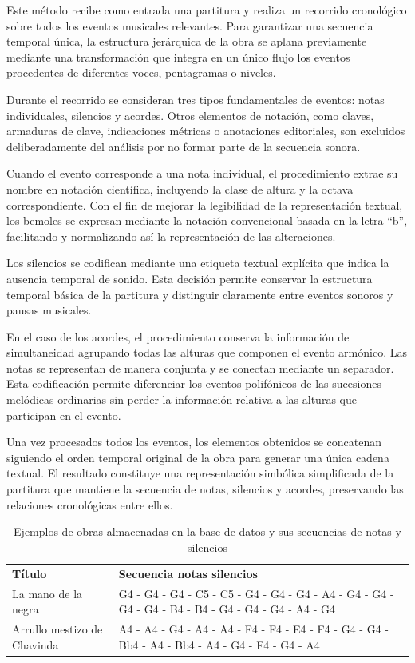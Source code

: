 Este método recibe como entrada una partitura y realiza un recorrido cronológico sobre todos los eventos musicales relevantes. Para garantizar una secuencia temporal única, la estructura jerárquica de la obra se aplana previamente mediante una transformación que integra en un único flujo los eventos procedentes de diferentes voces, pentagramas o niveles.

Durante el recorrido se consideran tres tipos fundamentales de eventos: notas individuales, silencios y acordes. Otros elementos de notación, como claves, armaduras de clave, indicaciones métricas o anotaciones editoriales, son excluidos deliberadamente del análisis por no formar parte de la secuencia sonora.

Cuando el evento corresponde a una nota individual, el procedimiento extrae su nombre en notación científica, incluyendo la clase de altura y la octava correspondiente. Con el fin de mejorar la legibilidad de la representación textual, los bemoles se expresan mediante la notación convencional basada en la letra “b”, facilitando y normalizando así la representación de las alteraciones.

Los silencios se codifican mediante una etiqueta textual explícita que indica la ausencia temporal de sonido. Esta decisión permite conservar la estructura temporal básica de la partitura y distinguir claramente entre eventos sonoros y pausas musicales.

En el caso de los acordes, el procedimiento conserva la información de simultaneidad agrupando todas las alturas que componen el evento armónico. Las notas se representan de manera conjunta y se conectan mediante un separador. Esta codificación permite diferenciar los eventos polifónicos de las sucesiones melódicas ordinarias sin perder la información relativa a las alturas que participan en el evento.

Una vez procesados todos los eventos, los elementos obtenidos se concatenan siguiendo el orden temporal original de la obra para generar una única cadena textual. El resultado constituye una representación simbólica simplificada de la partitura que mantiene la secuencia de notas, silencios y acordes, preservando las relaciones cronológicas entre ellos.

\begin{table}[H]
\centering
\begin{tabular}{l p{9.5cm}}
\textbf{Título} & \textbf{Secuencia notas silencios} \\
La mano de la negra & G4 - G4 - G4 - C5 - C5 - G4 - G4 - G4 - A4 - G4 - G4 - G4 - G4 - B4 - B4 - G4 - G4 - G4 - A4 - G4 \\
Arrullo mestizo de Chavinda & A4 - A4 - G4 - A4 - A4 - F4 - F4 - E4 - F4 - G4 - G4 - Bb4 - A4 - Bb4 - A4 - G4 - F4 - G4 - A4 \\
\end{tabular}
\caption{Ejemplos de obras almacenadas en la base de datos y sus secuencias de notas y silencios}
\end{table}

